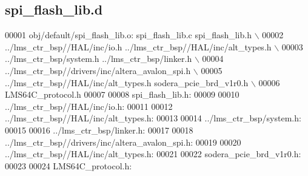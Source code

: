 \subsection{spi\+\_\+flash\+\_\+lib.\+d}
\label{spi__flash__lib_8d_source}

\begin{DoxyCode}
00001 obj/\textcolor{keywordflow}{default}/spi\_flash\_lib.o: spi\_flash\_lib.c spi\_flash\_lib.h \(\backslash\)
00002  ../lms\_ctr\_bsp\textcolor{comment}{//HAL/inc/io.h ../lms\_ctr\_bsp//HAL/inc/alt\_types.h \(\backslash\)}
00003 \textcolor{comment}{ ../lms\_ctr\_bsp/system.h ../lms\_ctr\_bsp/linker.h \(\backslash\)}
00004 \textcolor{comment}{ ../lms\_ctr\_bsp//drivers/inc/altera\_avalon\_spi.h \(\backslash\)}
00005 \textcolor{comment}{ ../lms\_ctr\_bsp//HAL/inc/alt\_types.h sodera\_pcie\_brd\_v1r0.h \(\backslash\)}
00006 \textcolor{comment}{ LMS64C\_protocol.h}
00007 
00008 spi\_flash\_lib.h:
00009 
00010 ../lms\_ctr\_bsp\textcolor{comment}{//HAL/inc/io.h:}
00011 
00012 ../lms\_ctr\_bsp\textcolor{comment}{//HAL/inc/alt\_types.h:}
00013 
00014 ../lms\_ctr\_bsp/system.h:
00015 
00016 ../lms\_ctr\_bsp/linker.h:
00017 
00018 ../lms\_ctr\_bsp\textcolor{comment}{//drivers/inc/altera\_avalon\_spi.h:}
00019 
00020 ../lms\_ctr\_bsp\textcolor{comment}{//HAL/inc/alt\_types.h:}
00021 
00022 sodera\_pcie\_brd\_v1r0.h:
00023 
00024 LMS64C\_protocol.h:
\end{DoxyCode}
